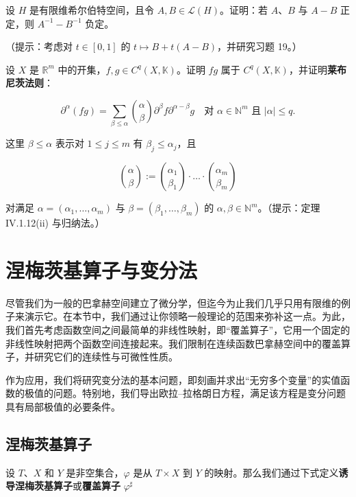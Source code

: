 \begin{exercises}
\item

设 $ H $ 是有限维希尔伯特空间，且令 $ A, B \in \mathcal{L}(H) $。证明：若 $ A $、$ B $ 与 $ A - B $ 正定，则 $ A^{-1} - B^{-1} $ 负定。

（提示：考虑对 $ t \in [0, 1] $ 的 $ t \mapsto B + t(A - B) $，并研究习题 19。）

\item

设 $ X $ 是 $ \mathbb{R}^{m} $ 中的开集，$ f, g \in C^{q}(X, \mathbb{K}) $。证明 $ fg $ 属于 $ C^{q}(X, \mathbb{K}) $，并证明\textbf{莱布尼茨法则}：

\[
\partial^{\alpha}(fg) = \sum_{\beta \le \alpha}\binom{\alpha}{\beta}\partial^{\beta}f\partial^{\alpha - \beta}g \quad \text{对 } \alpha \in \mathbb{N}^{m} \text{ 且 } |\alpha| \le q .
\]

这里 $ \beta \le \alpha $ 表示对 $ 1 \le j \le m $ 有 $ \beta_{j} \le \alpha_{j} $，且

\[
\binom{\alpha}{\beta} := \binom{\alpha_{1}}{\beta_{1}} \cdot \ldots \cdot \binom{\alpha_{m}}{\beta_{m}}
\]

对满足 $ \alpha = (\alpha_{1}, \ldots, \alpha_{m}) $ 与 $ \beta = (\beta_{1}, \ldots, \beta_{m}) $ 的 $ \alpha, \beta \in \mathbb{N}^{m} $。（提示：定理 IV.1.12(ii) 与归纳法。）

\end{exercises}

\section{涅梅茨基算子与变分法}

尽管我们为一般的巴拿赫空间建立了微分学，但迄今为止我们几乎只用有限维的例子来演示它。在本节中，我们通过让你领略一般理论的范围来弥补这一点。为此，我们首先考虑函数空间之间最简单的非线性映射，即“覆盖算子”，它用一个固定的非线性映射把两个函数空间连接起来。我们限制在连续函数巴拿赫空间中的覆盖算子，并研究它们的连续性与可微性性质。

作为应用，我们将研究变分法的基本问题，即刻画并求出“无穷多个变量”的实值函数的极值的问题。特别地，我们导出欧拉–拉格朗日方程，满足该方程是变分问题具有局部极值的必要条件。

\subsection*{涅梅茨基算子}

设 $ T $、$ X $ 和 $ Y $ 是非空集合，$ \varphi $ 是从 $ T \times X $ 到 $ Y $ 的映射。那么我们通过下式定义\textbf{诱导涅梅茨基算子}或\textbf{覆盖算子} $ \varphi^{\sharp} $

